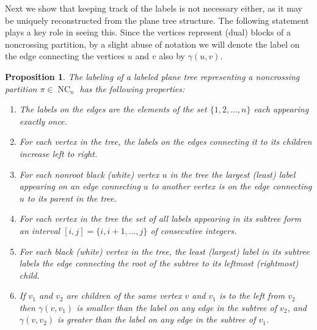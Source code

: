 \documentclass[11pt]{amsart}
\newtheorem{proposition}[theorem]{Proposition}
\numberwithin{equation}{section}
\DeclareMathOperator{\NC}{NC}
\begin{document}
Next we show that keeping track of the labels is not necessary either,
as it may be uniquely reconstructed from the plane tree structure. The
following statement plays a key role in seeing this. Since the vertices
represent (dual) blocks of a noncrossing partition, by a slight abuse of
notation we will denote the label on the edge connecting the vertices
$u$ and $v$ also by $\gamma(u,v)$.
\begin{proposition}
\label{proposition_labelkey}  
The labeling of a labeled plane tree representing a noncrossing
partition $\pi\in\NC_{n}$ has the following properties:
\begin{enumerate}
\item The labels on the edges are the elements of the set
  $\{1,2,\ldots,n\}$ each appearing exactly once.
\item For each vertex in the tree, the labels on the edges connecting it
  to its children increase left to right.
\item For each nonroot black (white) vertex $u$ in the tree the largest
  (least) label appearing on an edge connecting $u$ to another vertex is
  on the edge connecting $u$ to its parent in the tree.
\item For each vertex in the tree the set of all labels appearing in its
  subtree form an interval $[i,j]=\{i,i+1,\ldots,j\}$ of consecutive
  integers.
\item For each black (white) vertex in the tree, the least (largest)
  label in its subtree labels the edge connecting the root of the
  subtree to its leftmost (rightmost) child.   
\item If $v_{1}$ and $v_{2}$ are children of the same vertex $v$ and $v_{1}$
  is to the left from $v_{2}$ then $\gamma(v,v_{1})$ is smaller than the label
  on any edge in the subtree of $v_{2}$, and $\gamma(v,v_{2})$ is greater
  than the label on any edge in the subtree of $v_{1}$.  
\end{enumerate}  
\end{proposition}  
\end{document}
